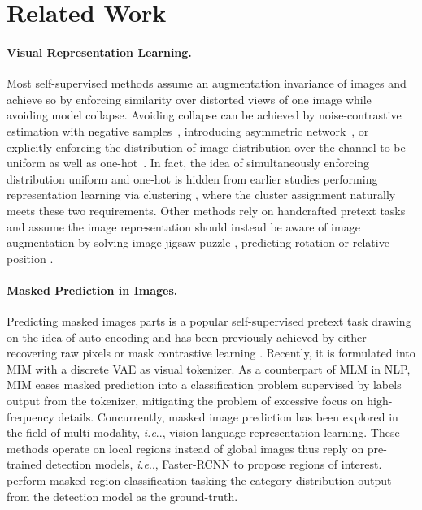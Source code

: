 \documentclass{article} \usepackage{iclr2022_conference,times}
\makeatletter
\DeclareRobustCommand\onedot{\futurelet\@let@token\@onedot}
\def\@onedot{\ifx\@let@token.\else.\null\fi\xspace}
\def\ie{\emph{i.e}\onedot} \def\Ie{\emph{I.e}\onedot}
\makeatother
\begin{document}
\section{Related Work}

\paragraph{Visual Representation Learning.} 
Most self-supervised methods assume an augmentation invariance of images and achieve so by enforcing similarity over distorted views of one image while avoiding model collapse.
Avoiding collapse can be achieved by noise-contrastive estimation with negative samples~\citep{instdist,moco,simclr}, introducing asymmetric network~\citep{byol,simsiam}, or explicitly enforcing the distribution of image distribution over the channel to be uniform as well as one-hot~\citep{swav,self-classifier,dino}. 
In fact, the idea of simultaneously enforcing distribution uniform and one-hot is hidden from earlier studies performing representation learning via clustering \citep{deepcluster,swav,self-labelling}, where the cluster assignment naturally meets these two requirements.
Other methods rely on handcrafted pretext tasks and assume the image representation should instead be aware of image augmentation by solving image jigsaw puzzle \citep{jigsaw,iterjigsaw}, predicting rotation \citep{rotnet} or relative position \citep{pos}. 



\paragraph{Masked Prediction in Images.} 
Predicting masked images parts is a popular self-supervised pretext task drawing on the idea of auto-encoding and has been previously achieved by either recovering raw pixels \citep{inpainting,sit,mst} or mask contrastive learning \citep{cpcv2,maskco}. 
Recently, it is formulated into MIM \citep{beit,vimpac} with a discrete VAE \citep{dvae,dalle} as visual tokenizer. As a counterpart of MLM in NLP, MIM eases masked prediction into a classification problem supervised by labels output from the tokenizer, mitigating the problem of excessive focus on high-frequency details.
Concurrently, masked image prediction has been explored in the field of multi-modality, \ie, vision-language representation learning. These methods operate on local regions instead of global images thus reply on pre-trained detection models, \ie, Faster-RCNN \citep{fasterrcnn} to propose regions of interest. \citep{vlbert,vilbert,uniter} perform masked region classification tasking the category distribution output from the detection model as the ground-truth.
\end{document}
